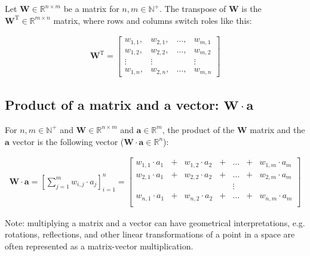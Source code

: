 \documentclass[titlepage]{article}
\begin{document}
        Let $\mathbf{W} \in \mathbb{R}^{n \times m}$ be a matrix for
        $n, m \in \mathbb{N}^+$. The transpose of $\mathbf{W}$ is the
        $\mathbf{W}^\mathrm{T} \in \mathbb{R}^{m \times n}$ matrix, where
        rows and columns switch roles like this:

        \begin{align*}
          \mathbf{W}^\mathrm{T}
            = \begin{bmatrix}
                w_{1,1}, & w_{2,1}, & \ldots, & w_{m,1} \\
                w_{1,2}, & w_{2,2}, & \ldots, & w_{m,2} \\
                \vdots & \vdots & & \vdots \\
                w_{1,n}, & w_{2,n}, & \ldots, & w_{m,n}
              \end{bmatrix}
        \end{align*}

      \subsection{%
        Product of a matrix and a vector: $\mathbf{W} \cdot \mathbf{a}$
      }

        For $n, m \in \mathbb{N}^+$ and
        $\mathbf{W} \in \mathbb{R}^{n \times m}$ and
        $\mathbf{a} \in \mathbb{R}^m$, the product of the $\mathbf{W}$ matrix
        and the $\mathbf{a}$ vector is the following vector
        ($\mathbf{W} \cdot \mathbf{a} \in \mathbb{R}^n$):

        \begin{align*}
          \mathbf{W} \cdot \mathbf{a}
            = \left[ \sum_{j=1}^m w_{i,j} \cdot a_j \right]_{i=1}^n
            = \begin{bmatrix}
                w_{1,1} \cdot a_1 & + & w_{1,2} \cdot a_2
                  & + & \ldots & + & w_{1,m} \cdot a_m  \\
                w_{2,1} \cdot a_1 & + & w_{2,2} \cdot a_2
                  & + & \ldots & + & w_{2,m} \cdot a_m  \\
                & & & & \vdots & & \\
                w_{n,1} \cdot a_1 & + & w_{n,2} \cdot a_2
                  & + & \ldots & + & w_{n,m} \cdot a_m  \\
              \end{bmatrix}
        \end{align*}

        Note: multiplying a matrix and a vector can have geometrical
        interpretations, e.g. rotations, reflections, and other linear
        transformations of a point in a space are often represented as a
        matrix-vector multiplication.
\end{document}

